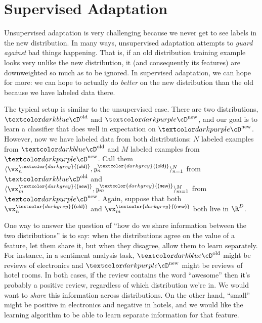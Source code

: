 \section{Supervised Adaptation}

Unsupervised adaptation is very challenging because we never get to see labels in the new distribution.
In many ways, unsupervised adaptation attempts to \emph{guard against} bad things happening.
That is, if an old distribution training example looks very unlike the new distribution, it (and consequently its features) are downweighted so much as to be ignored.
In supervised adaptation, we can hope for more: we can hope to actually do \emph{better} on the new distribution than the old because we have labeled data there.

\newcommand{\vxold}{\vx^{\textcolor{darkgrey}{\textsf{(old)}}}}
\newcommand{\vxnew}{\vx^{\textcolor{darkgrey}{\textsf{(new)}}}}
\newcommand{\yold}{y^{\textcolor{darkgrey}{\textsf{(old)}}}}
\newcommand{\ynew}{y^{\textcolor{darkgrey}{\textsf{(new)}}}}

The typical setup is similar to the unsupervised case. There are two distributions, $\Dold$ and $\Dnew$, and our goal is to learn a classifier that does well in expectation on $\Dnew$. However, now we have labeled data from both distributions: $N$ labeled examples from $\Dold$ and $M$ labeled examples from $\Dnew$. Call them $\langle \vxold_n, \yold_n \rangle_{n=1}^N$ from $\Dold$ and $\langle \vxnew_m, \ynew_m \rangle_{m=1}^M$ from $\Dnew$. Again, suppose that both $\vxold_n$ and $\vxnew_m$ both live in $\R^D$.

One way to answer the question of ``how do we share information between the two distributions'' is to say: when the distributions agree on the value of a feature, let them share it, but when they disagree, allow them to learn separately. For instance, in a sentiment analysis task, $\Dold$ might be reviews of electronics and $\Dnew$ might be reviews of hotel rooms. In both cases, if the review contains the word ``awesome'' then it's probably a positive review, regardless of which distribution we're in. We would want to \emph{share} this information across distributions. On the other hand, ``small'' might be positive in electronics and negative in hotels, and we would like the learning algorithm to be able to learn separate information for that feature.

